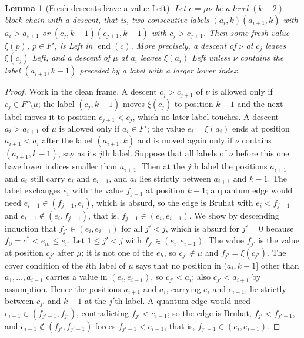 \documentclass[11pt]{article}
\newtheorem{lemma}[proposition]{Lemma}
\begin{document}
\begin{lemma}[Fresh descents leave a value Left]\label{lem:descent-left}
Let $c=\mu\nu$ be a level-$(k-2)$ block chain with a descent, that is,
two consecutive labels $(a_i,k)(a_{i+1},k)$ with $a_i>a_{i+1}$ or
$(c_j,k-1)(c_{j+1},k-1)$ with $c_j>c_{j+1}$. Then some fresh value
$\xi(p)$, $p\in F'$, is Left in $\operatorname{end}(c)$. More
precisely, a descent of $\nu$ at $c_j$ leaves $\xi(c_j)$ Left, and a
descent of $\mu$ at $a_i$ leaves $\xi(a_i)$ Left unless $\nu$ contains
the label $(a_{i+1},k-1)$ preceded by a label with a larger lower
index.
\end{lemma}

\begin{proof}
Work in the clean frame. A descent $c_j>c_{j+1}$ of $\nu$ is allowed
only if $c_j\in F'\setminus\mu$; the label $(c_j,k-1)$ moves $\xi(c_j)$
to position $k-1$ and the next label moves it to position
$c_{j+1}<c_j$, which no later label touches. A descent $a_i>a_{i+1}$
of $\mu$ is allowed only if $a_i\in F'$; the value $e_i=\xi(a_i)$ ends
at position $a_{i+1}<a_i$ after the label $(a_{i+1},k)$ and is moved
again only if $\nu$ contains $(a_{i+1},k-1)$, say as its $j$th label.
Suppose that all labels of $\nu$ before this one have lower indices
smaller than $a_{i+1}$. Then at the $j$th label the positions $a_{i+1}$
and $a_i$ still carry $e_i$ and $e_{i-1}$, and $a_i$ lies strictly
between $a_{i+1}$ and $k-1$. The label exchanges $e_i$ with the value
$f_{j-1}$ at position $k-1$; a quantum edge would need
$e_{i-1}\in(f_{j-1},e_i)$, which is absurd, so the edge is Bruhat
with $e_i<f_{j-1}$ and $e_{i-1}\notin(e_i,f_{j-1})$, that is,
$f_{j-1}\in(e_i,e_{i-1})$. We show by descending induction that
$f_{j'}\in(e_i,e_{i-1})$ for all $j'<j$, which is absurd for $j'=0$
because $f_0=c^\ast<e_m\leq e_i$. Let $1\leq j'<j$ with
$f_{j'}\in(e_i,e_{i-1})$. The value $f_{j'}$ is the value at position
$c_{j'}$ after $\mu$; it is not one of the $e_h$, so $c_{j'}\notin\mu$
and $f_{j'}=\xi(c_{j'})$. The cover condition of the $i$th label of
$\mu$ says that no position in $(a_i,k-1]$ other than
$a_1,\ldots,a_{i-1}$ carries a value in $(e_i,e_{i-1})$, so
$c_{j'}<a_i$; also $c_{j'}<a_{i+1}$ by assumption. Hence the
positions $a_{i+1}$ and $a_i$, carrying $e_i$ and $e_{i-1}$, lie
strictly between $c_{j'}$ and $k-1$ at the $j'$th label. A quantum
edge would need $e_{i-1}\in(f_{j'-1},f_{j'})$, contradicting
$f_{j'}<e_{i-1}$; so the edge is Bruhat, $f_{j'}<f_{j'-1}$, and
$e_{i-1}\notin(f_{j'},f_{j'-1})$ forces $f_{j'-1}<e_{i-1}$, that is,
$f_{j'-1}\in(e_i,e_{i-1})$.
\end{proof}
\end{document}
